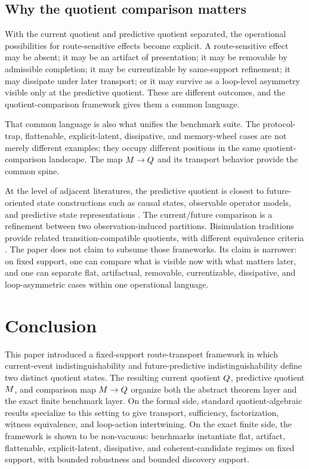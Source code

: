 \documentclass[11pt]{article}
\theoremstyle{definition}
\begin{document}
\subsection{Why the quotient comparison matters}\label{subsec:discussion-why}
With the current quotient and predictive quotient separated, the operational possibilities for route-sensitive effects become explicit. A route-sensitive effect may be absent; it may be an artifact of presentation; it may be removable by admissible completion; it may be currentizable by same-support refinement; it may dissipate under later transport; or it may survive as a loop-level asymmetry visible only at the predictive quotient. These are different outcomes, and the quotient-comparison framework gives them a common language.

That common language is also what unifies the benchmark suite. The protocol-trap, flattenable, explicit-latent, dissipative, and memory-wheel cases are not merely different examples; they occupy different positions in the same quotient-comparison landscape. The map $M \to Q$ and its transport behavior provide the common spine.

At the level of adjacent literatures, the predictive quotient is closest to future-oriented state constructions such as causal states, observable operator models, and predictive state representations \citep{ShaliziCrutchfield2001ComputationalMechanics,Jaeger2000ObservableOperatorModels,LittmanSuttonSingh2002PredictiveRepresentationsState}. The current/future comparison is a refinement between two observation-induced partitions. Bisimulation traditions provide related transition-compatible quotients, with different equivalence criteria \citep{Park1981ConcurrencyAutomata,Milner1989CommunicationConcurrency,LarsenSkou1991BisimulationThroughProbabilisticTesting}. The paper does not claim to subsume those frameworks. Its claim is narrower: on fixed support, one can compare what is visible now with what matters later, and one can separate flat, artifactual, removable, currentizable, dissipative, and loop-asymmetric cases within one operational language.

\section{Conclusion}\label{sec:conclusion}
This paper introduced a fixed-support route-transport framework in which current-event indistinguishability and future-predictive indistinguishability define two distinct quotient states. The resulting current quotient $Q$, predictive quotient $M$, and comparison map $M \to Q$ organize both the abstract theorem layer and the exact finite benchmark layer. On the formal side, standard quotient-algebraic results specialize to this setting to give transport, sufficiency, factorization, witness equivalence, and loop-action intertwining. On the exact finite side, the framework is shown to be non-vacuous: benchmarks instantiate flat, artifact, flattenable, explicit-latent, dissipative, and coherent-candidate regimes on fixed support, with bounded robustness and bounded discovery support.
\end{document}

